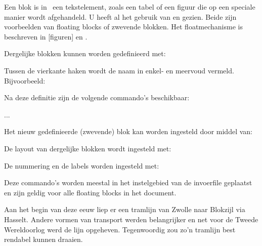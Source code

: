 

Een blok is in \CONTEXT\ een tekstelement, zoals een tabel
of een figuur die op een speciale manier wordt afgehandeld.
U heeft al het gebruik van \type{\plaatsfiguur} en
\type{\plaatstabel} gezien. Beide zijn voorbeelden van
floating blocks of zwevende blokken. Het floatmechanisme is
beschreven in [figuren] en \in[tabellen].

Dergelijke blokken kunnen worden gedefinieerd met:


Tussen de vierkante haken wordt de naam in enkel- en meervoud
vermeld. Bijvoorbeeld:

\starttypen
{}
\stoptypen

Na deze definitie zijn de volgende commando's beschikbaar:

\starttypen
\plaatsintermezzo[][]{}{}
\startintermezzotekst ... \stopintermezzotekst
\plaatslijstmetintermezzos
\volledigelijstmetintermezzos
\stoptypen

Het nieuw gedefinieerde (zwevende) blok kan worden ingesteld
door middel van:


De layout van dergelijke blokken wordt ingesteld met:


De nummering en de labels worden ingesteld met:


Deze commando's worden meestal in het instelgebied van de
invoerfile geplaatst en zijn geldig voor alle floating
blocks in het document.

\startbuffer
\stelplaatsblokkenin[plaats=midden]
\stelblokkopjesin[plaats=onder,kopletter=vetschuin]

\startkadertekst
Aan het begin van deze eeuw liep er een tramlijn van Zwolle
naar Blokzijl via Hasselt. Andere vormen van transport
werden belangrijker en net voor de Tweede Wereldoorlog werd
de lijn opgeheven. Tegenwoordig zou zo'n tramlijn best
rendabel kunnen draaien.
\stopkadertekst
\stopbuffer

\typebuffer


